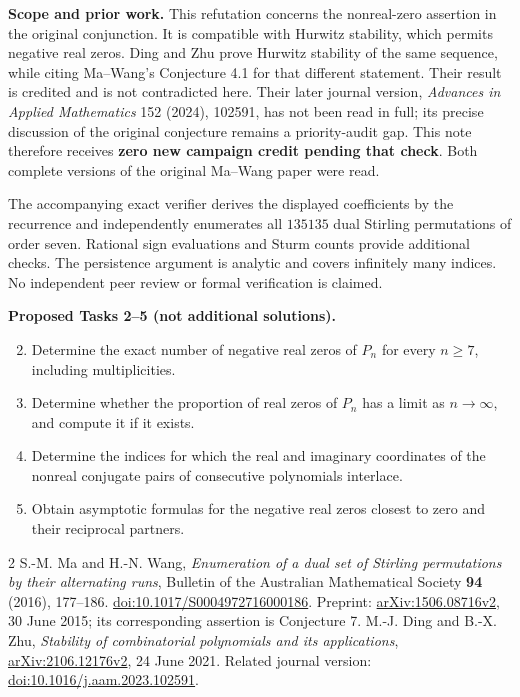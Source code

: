 \documentclass[11pt]{article}
\begin{document}
\noindent\textbf{Scope and prior work.}
This refutation concerns the nonreal-zero assertion in the original
conjunction. It is compatible with Hurwitz stability, which permits
negative real zeros. Ding and Zhu \cite[Conjecture 2.13 and Proposition
2.16]{DZ} prove Hurwitz stability of the same sequence, while citing
Ma--Wang's Conjecture 4.1 for that different statement. Their result is
credited and is not contradicted here. Their later journal version,
\emph{Advances in Applied Mathematics} 152 (2024), 102591, has not been
read in full; its precise discussion of the original conjecture remains
a priority-audit gap. This note therefore receives \textbf{zero new
campaign credit pending that check}. Both complete versions of the
original Ma--Wang paper were read.

The accompanying exact verifier derives the displayed coefficients by
the recurrence and independently enumerates all $135135$ dual Stirling
permutations of order seven. Rational sign evaluations and Sturm counts
provide additional checks. The persistence argument is analytic and
covers infinitely many indices. No independent peer review or formal
verification is claimed.

\medskip
\noindent\textbf{Proposed Tasks 2--5 (not additional solutions).}
\begin{enumerate}
\setcounter{enumi}{1}
\item Determine the exact number of negative real zeros of $P_n$ for every
$n\ge7$, including multiplicities.
\item Determine whether the proportion of real zeros of $P_n$ has a limit
as $n\to\infty$, and compute it if it exists.
\item Determine the indices for which the real and imaginary coordinates
of the nonreal conjugate pairs of consecutive polynomials interlace.
\item Obtain asymptotic formulas for the negative real zeros closest to
zero and their reciprocal partners.
\end{enumerate}

\begin{thebibliography}{2}
 S.-M. Ma and H.-N. Wang,
\emph{Enumeration of a dual set of Stirling permutations by their
alternating runs}, Bulletin of the Australian Mathematical Society
\textbf{94} (2016), 177--186.
\href{https://doi.org/10.1017/S0004972716000186}{doi:10.1017/S0004972716000186}.
Preprint: \href{https://arxiv.org/abs/1506.08716}{arXiv:1506.08716v2},
30 June 2015; its corresponding assertion is Conjecture 7.
 M.-J. Ding and B.-X. Zhu,
\emph{Stability of combinatorial polynomials and its applications},
\href{https://arxiv.org/abs/2106.12176}{arXiv:2106.12176v2}, 24 June 2021.
Related journal version:
\href{https://doi.org/10.1016/j.aam.2023.102591}{doi:10.1016/j.aam.2023.102591}.
\end{thebibliography}
\end{document}
